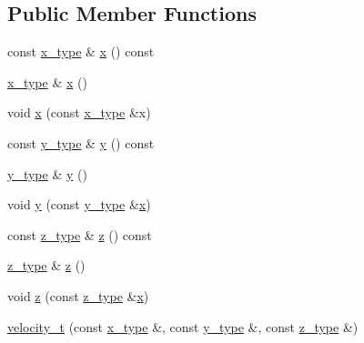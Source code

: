 \subsection*{Public Member Functions}
\begin{DoxyCompactItemize}
\item 
const \hyperlink{classvelocity__t_a96ff8f29edf435cfe0966409d22b33c7}{x\-\_\-type} \& \hyperlink{classvelocity__t_adc045e174c1631079cef733f987193c1}{x} () const 
\item 
\hyperlink{classvelocity__t_a96ff8f29edf435cfe0966409d22b33c7}{x\-\_\-type} \& \hyperlink{classvelocity__t_aeaea25c597e626199aa231e96df21c45}{x} ()
\item 
void \hyperlink{classvelocity__t_a51e6012bcd94ccde9169b8b38b8322bf}{x} (const \hyperlink{classvelocity__t_a96ff8f29edf435cfe0966409d22b33c7}{x\-\_\-type} \&x)
\item 
const \hyperlink{classvelocity__t_aab88921abbd89667cc4d293a448877f3}{y\-\_\-type} \& \hyperlink{classvelocity__t_a5470a18d9c20945aa0905b887fa5b19e}{y} () const 
\item 
\hyperlink{classvelocity__t_aab88921abbd89667cc4d293a448877f3}{y\-\_\-type} \& \hyperlink{classvelocity__t_a951fe39a3f18bc9057fd72ea45744914}{y} ()
\item 
void \hyperlink{classvelocity__t_a6f2874f8598611f2f3d2087cd2c6d33b}{y} (const \hyperlink{classvelocity__t_aab88921abbd89667cc4d293a448877f3}{y\-\_\-type} \&\hyperlink{classvelocity__t_adc045e174c1631079cef733f987193c1}{x})
\item 
const \hyperlink{classvelocity__t_a0268003d7669eaa63abdcd4df2933316}{z\-\_\-type} \& \hyperlink{classvelocity__t_a0ce6cb31c27de3b2e4f712a46ad40ce4}{z} () const 
\item 
\hyperlink{classvelocity__t_a0268003d7669eaa63abdcd4df2933316}{z\-\_\-type} \& \hyperlink{classvelocity__t_ae826294ca0cd396171920fad19a53c00}{z} ()
\item 
void \hyperlink{classvelocity__t_a6a25b6218ee7ca189fb6a6013b42502a}{z} (const \hyperlink{classvelocity__t_a0268003d7669eaa63abdcd4df2933316}{z\-\_\-type} \&\hyperlink{classvelocity__t_adc045e174c1631079cef733f987193c1}{x})
\item 
\hyperlink{classvelocity__t_acced6c7af3eca84743556a378e15b137}{velocity\-\_\-t} (const \hyperlink{classvelocity__t_a96ff8f29edf435cfe0966409d22b33c7}{x\-\_\-type} \&, const \hyperlink{classvelocity__t_aab88921abbd89667cc4d293a448877f3}{y\-\_\-type} \&, const \hyperlink{classvelocity__t_a0268003d7669eaa63abdcd4df2933316}{z\-\_\-type} \&)

\end{DoxyCompactItemize}
